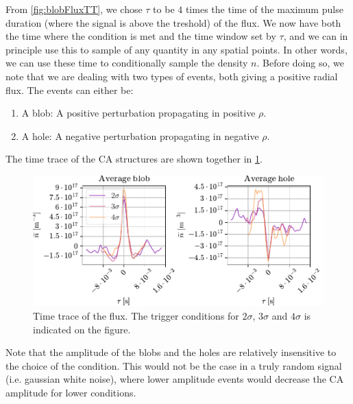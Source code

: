 From \cref{fig:blobFluxTT}, we chose $\tau$ to be $4$ times the time of the maximum pulse duration (where the signal is above the treshold) of the flux.
We now have both the time where the condition is met and the time window set by $\tau$, and we can in principle use this to sample of any quantity in any spatial points.
In other words, we can use these time to conditionally sample the density $n$.
Before doing so, we note that we are dealing with two types of events, both giving a positive radial flux.
The events can either be:
%
\begin{enumerate}[noitemsep]
    \item A blob: A positive perturbation propagating in positive $\rho$.
    \item A hole: A negative perturbation propagating in negative $\rho$.
\end{enumerate}
%
The time trace of the CA structures are shown together in \cref{fig:blobAndHole2D}.
%
\begin{figure}[htb]
    \begin{center}
        \includegraphics{fig/results/blobs/blobsAndHoles-B0_008Tweak}
    \end{center}
    \caption{
        Time trace of the flux.
        The trigger conditions for $2\sigma$, $3\sigma$ and $4\sigma$ is indicated on the figure.
    }
    \label{fig:blobAndHole2D}
\end{figure}
%
Note that the amplitude of the blobs and the holes are relatively insensitive to the choice of the condition.
This would not be the case in a truly random signal (i.e. gaussian white noise), where lower amplitude events would decrease the CA amplitude for lower conditions.

